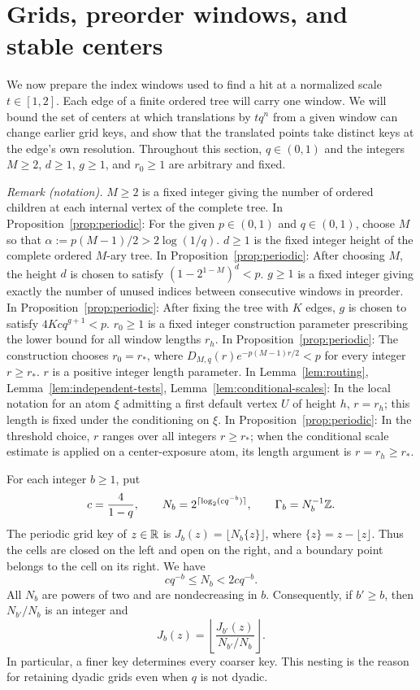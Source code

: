 \section{Grids, preorder windows, and stable centers}\label{sec:windows}

We now prepare the index windows used to find a hit at a normalized scale
$t\in[1,2]$.  Each edge of a finite ordered tree will carry one window.
We will bound the set of centers at which translations by $tq^n$ from a
given window can change earlier grid keys, and show that the translated
points take distinct keys at the edge's own resolution.
Throughout this section, $q\in(0,1)$ and the integers
$M\ge2$, $d\ge1$, $g\ge1$, and $r_0\ge1$ are arbitrary and fixed.

\noindent\textit{Remark (notation).} $M\ge2$ is a fixed integer giving the number of ordered children at each internal vertex of the complete tree. In Proposition~\ref{prop:periodic}: For the given $p\in(0,1)$ and $q\in(0,1)$, choose $M$ so that $\alpha:=p(M-1)/2>2\log(1/q)$. $d\ge1$ is the fixed integer height of the complete ordered $M$-ary tree. In Proposition~\ref{prop:periodic}: After choosing $M$, the height $d$ is chosen to satisfy $(1-2^{1-M})^d<p$. $g\ge1$ is a fixed integer giving exactly the number of unused indices between consecutive windows in preorder. In Proposition~\ref{prop:periodic}: After fixing the tree with $K$ edges, $g$ is chosen to satisfy $4Kc q^{g+1}<p$. $r_0\ge1$ is a fixed integer construction parameter prescribing the lower bound for all window lengths $r_h$. In Proposition~\ref{prop:periodic}: The construction chooses $r_0=r_*$, where $D_{M,q}(r)e^{-p(M-1)r/2}<p$ for every integer $r\ge r_*$. $r$ is a positive integer length parameter. In Lemma~\ref{lem:routing}, Lemma~\ref{lem:independent-tests}, Lemma~\ref{lem:conditional-scales}: In the local notation for an atom $\xi$ admitting a first default vertex $U$ of height $h$, $r=r_h$; this length is fixed under the conditioning on $\xi$. In Proposition~\ref{prop:periodic}: In the threshold choice, $r$ ranges over all integers $r\ge r_*$; when the conditional scale estimate is applied on a center-exposure atom, its length argument is $r=r_h\ge r_*$.


For each integer $b\ge1$, put
\[
 c=\frac{4}{1-q},\qquad
 N_b=2^{\lceil\log_2(cq^{-b})\rceil},\qquad
 \Gamma_b=N_b^{-1}\mathbb Z.
\]
The periodic grid key of $z\in\mathbb R$ is
$J_b(z)=\lfloor N_b\{z\}\rfloor$, where
$\{z\}=z-\lfloor z\rfloor$.  Thus the cells are closed on the left and
open on the right, and a boundary point belongs to the cell on its right.
We have
\begin{equation}\label{eq:grid-size}
 cq^{-b}\le N_b<2cq^{-b}.
\end{equation}
All $N_b$ are powers of two and are nondecreasing in $b$.  Consequently,
if $b'\ge b$, then $N_{b'}/N_b$ is an integer and
\[
 J_b(z)=\left\lfloor\frac{J_{b'}(z)}{N_{b'}/N_b}\right\rfloor.
\]
In particular, a finer key determines every coarser key.  This nesting
is the reason for retaining dyadic grids even when $q$ is not dyadic.

